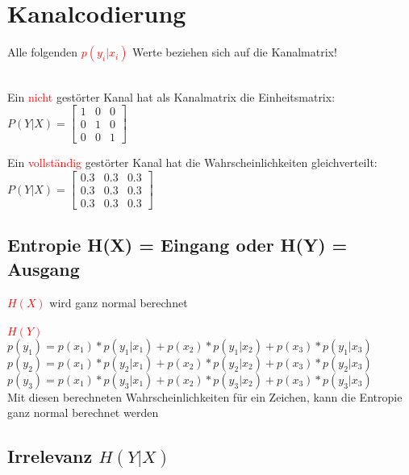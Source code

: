 \section{Kanalcodierung}
Alle folgenden \textcolor{red}{$p(y_i|x_i)$} Werte beziehen sich auf die Kanalmatrix!\\\\
\begin{minipage}[t]{0.15\textwidth}
    Ein \textcolor{red}{nicht} gestörter Kanal hat als Kanalmatrix die Einheitsmatrix:\\
    $P(Y|X) = \begin{bmatrix}
                  1 & 0 & 0\\
                  0 & 1 & 0\\
                  0 & 0 & 1
    \end{bmatrix}$
\end{minipage}
\hfill
\begin{minipage}[t]{0.15\textwidth}
    Ein \textcolor{red}{vollständig} gestörter Kanal hat die Wahrscheinlichkeiten gleichverteilt:\\
    $P(Y|X) = \begin{bmatrix}
                  0.3 & 0.3 & 0.3\\
                  0.3 & 0.3 & 0.3\\
                  0.3 & 0.3 & 0.3
    \end{bmatrix}$
\end{minipage}


\subsection{Entropie H(X) = Eingang oder H(Y) = Ausgang}
\textcolor{red}{$H(X)$} wird ganz normal berechnet\\\\
\textcolor{red}{$H(Y)$} \\
\colorbox{lightlightgrey}{$p(y_1) = p(x_1)*p(y_1|x_1) + p(x_2)*p(y_1|x_2) + p(x_3)*p(y_1|x_3)$}\\
\colorbox{lightlightgrey}{$p(y_2) = p(x_1)*p(y_2|x_1) + p(x_2)*p(y_2|x_2) + p(x_3)*p(y_2|x_3)$}\\
\colorbox{lightlightgrey}{$p(y_3) = p(x_1)*p(y_3|x_1) + p(x_2)*p(y_3|x_2) + p(x_3)*p(y_3|x_3)$}\\
Mit diesen berechneten Wahrscheinlichkeiten für ein Zeichen, kann die Entropie ganz normal berechnet werden


\subsection{Irrelevanz $H(Y|X)$}


